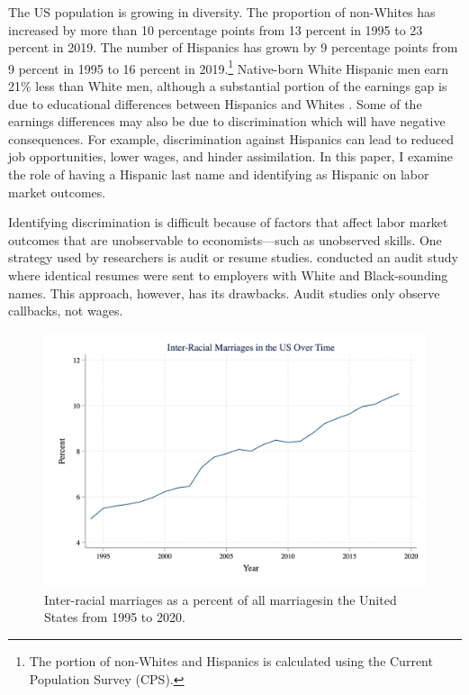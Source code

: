 \documentclass[a4paper,fleqn]{cas-sc}
\begin{document}
The US population is growing in diversity. The proportion of non-Whites has increased by more than 10 percentage points from 13 percent in 1995 to 23 percent in 2019. The number of Hispanics has grown by 9 percentage points from 9 percent in 1995 to 16 percent in 2019.\footnote{The portion of non-Whites and Hispanics is calculated using the Current Population Survey (CPS).} Native-born White Hispanic men earn 21\% less than White men, although a substantial portion of the earnings gap is due to educational differences between Hispanics and Whites \citep{duncan2006hispanics, duncan2018identifying, duncan2018socioeconomic}. Some of the earnings differences may also be due to discrimination which will have negative consequences. For example, discrimination against Hispanics can lead to reduced job opportunities, lower wages, and hinder assimilation. In this paper, I examine the role of having a Hispanic last name and identifying as Hispanic on labor market outcomes.

Identifying discrimination is difficult because of factors that affect labor market outcomes that are unobservable to economists---such as unobserved skills. One strategy used by researchers is audit or resume studies. \citet{bertrand2004emily} conducted an audit study where identical resumes were sent to employers with White and Black-sounding names. This approach, however, has its drawbacks. Audit studies only observe callbacks, not wages.

\begin{figure}[t]
\centering
\includegraphics[scale=0.25]{Fig/interracialovertime.png}
\caption{Inter-racial marriages as a percent of all marriagesin the United States from 1995 to 2020.}
\label{fig:3}
\end{figure}
\end{document}

